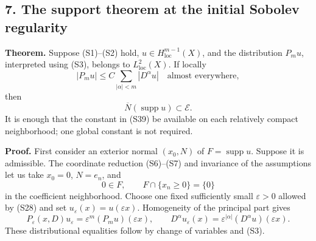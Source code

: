 \documentclass[
  11pt,
]{article}
\makeatletter
\let\ReaderOriginalAnchorStart\hyper@anchorstart
\let\ReaderOriginalAnchorEnd\hyper@anchorend
\let\ReaderPendingAliases\@empty
\def\ReaderArmAliases#1{\gdef\ReaderPendingAliases{#1}}
\def\hyper@anchorstart#1{\ReaderIfNativeAnchorTF{#1}{\ReaderPendingAliases\global\let\ReaderPendingAliases\@empty}{}\ReaderOriginalAnchorStart{#1}}
\makeatother
\begin{document}
\ReaderArmAliases{\ReaderOriginalAnchorStart{AN03-SUC-007}\ReaderOriginalAnchorEnd\begingroup\expandafter\def\csname @currentHref\endcsname{AN03-SUC-007}\label{AN03-SUC-007}\endgroup\ReaderOriginalAnchorStart{an03-suc-007-the-support-theorem-at-the-initial-sobolev-regularity}\ReaderOriginalAnchorEnd\begingroup\expandafter\def\csname @currentHref\endcsname{an03-suc-007-the-support-theorem-at-the-initial-sobolev-regularity}\label{an03-suc-007-the-support-theorem-at-the-initial-sobolev-regularity}\endgroup\ReaderOriginalAnchorStart{7-the-support-theorem-at-the-initial-sobolev-regularity}\ReaderOriginalAnchorEnd\begingroup\expandafter\def\csname @currentHref\endcsname{7-the-support-theorem-at-the-initial-sobolev-regularity}\label{7-the-support-theorem-at-the-initial-sobolev-regularity}\endgroup\ReaderOriginalAnchorStart{the-support-theorem-at-the-initial-sobolev-regularity}\ReaderOriginalAnchorEnd}
\subsection{7. The support theorem at the initial Sobolev
regularity}\label{the-support-theorem-at-the-initial-sobolev-regularity}

\textbf{Theorem.} Suppose (S1)--(S2) hold,
\(u\in H^{m-1}_{\mathrm{loc}}(X)\), and the distribution \(P_mu\),
interpreted using (S3), belongs to \(L^2_{\mathrm{loc}}(X)\). If locally
\[
 |P_mu|\leq C\sum_{|\alpha|<m}|D^\alpha u|\quad\text{almost everywhere},
                                                                    \tag{S39}
\] then \[
                  \overline N(\operatorname{supp}u)\subset\mathcal E.
                                                                    \tag{S40}
\] It is enough that the constant in (S39) be available on each
relatively compact neighborhood; one global constant is not required.

\textbf{Proof.} First consider an exterior normal \((x_0,N)\) of
\(F=\operatorname{supp}u\). Suppose it is admissible. The coordinate
reduction (S6)--(S7) and invariance of the assumptions let us take
\(x_0=0\), \(N=e_n\), and \[
               0\in F,\qquad F\cap\{x_n\geq0\}=\{0\}             \tag{S41}
\] in the coefficient neighborhood. Choose one fixed sufficiently small
\(\varepsilon>0\) allowed by (S28) and set
\(u_\varepsilon(x)=u(\varepsilon x)\). Homogeneity of the principal part
gives \[
 P_\varepsilon(x,D)u_\varepsilon
       =\varepsilon^m(P_mu)(\varepsilon x),\qquad
 D^\alpha u_\varepsilon(x)=\varepsilon^{|\alpha|}
                                  (D^\alpha u)(\varepsilon x).  \tag{S42}
\] These distributional equalities follow by change of variables and
(S3).
\end{document}
